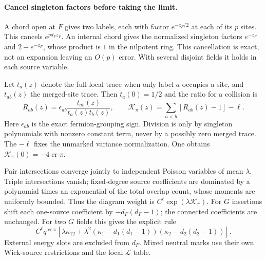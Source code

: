 \documentclass[11pt]{article}
\newcommand{\LL}{\mathcal L}
\newcommand{\crs}{\operatorname{cr}}
\begin{document}
\paragraph{Cancel singleton factors before taking the limit.}
A chord open at $F$ gives two labels, each with factor $e^{-z_F/2}$
at each of its $p$ sites. This cancels $e^{pd_Fz_F}$.
An internal chord gives the normalized singleton factors
$e^{-z_F}$ and $2-e^{-z_F}$, whose product is $1$ in the nilpotent
ring. This cancellation is exact, not an expansion leaving an $O(p)$
error. With several disjoint fields it holds in each source variable.

Let $t_a(z)$ denote the full local trace when only label $a$ occupies
a site, and $t_{ab}(z)$ the merged-site trace. Then $t_a(0)=1/2$ and
the ratio for a collision is
\begin{equation}
 R_{ab}(z)=\epsilon_{ab}\frac{t_{ab}(z)}{t_a(z)t_b(z)},\qquad
 \mathcal K_\pi(z)=\sum_{a<b}[R_{ab}(z)-1]-\ell.\label{eq:ratio}
\end{equation}
Here $\epsilon_{ab}$ is the exact fermion-grouping sign. Division is
only by singleton polynomials with nonzero constant term, never by
a possibly zero merged trace. The $-\ell$ fixes the unmarked variance
normalization. One obtains $\mathcal K_\pi(0)=-4\crs\pi$.

Pair intersections converge jointly to independent Poisson variables
of mean $\lambda$. Triple intersections vanish; fixed-degree source
coefficients are dominated by a polynomial times an exponential of
the total overlap count, whose moments are uniformly bounded.
Thus the diagram weight is $C^\ell\exp(\lambda\mathcal K_\pi)$.
For $G$ insertions shift each one-source coefficient by
$-d_F(d_F-1)$; the connected coefficients are unchanged. For two
$G$ fields this gives the explicit rule
\begin{equation}
 C^\ell q^{\crs\pi}
 \left[\lambda\kappa_{12}+
 \lambda^2(\kappa_1-d_1(d_1-1))(\kappa_2-d_2(d_2-1))\right].
 \label{eq:wholeweight}
\end{equation}
External energy slots are excluded from $d_F$. Mixed neutral marks
use their own Wick-source restrictions and the local $\LL$ table.

\newpage
\end{document}
